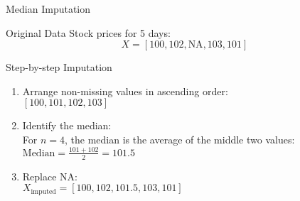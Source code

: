 \documentclass{beamer}
\begin{document}
\begin{frame}{Median Imputation}
   \begin{block}{Original Data}
       Stock prices for 5 days:
       \[
       X = [100, 102, \text{NA}, 103, 101]
       \]
   \end{block}

   \begin{block}{Step-by-step Imputation}
       \begin{enumerate}
           \item Arrange non-missing values in ascending order:\\
           $[100, 101, 102, 103]$
           \item Identify the median:\\
           For $n=4$, the median is the average of the middle two values:\\
           $\text{Median} = \frac{101 + 102}{2} = 101.5$
           \item Replace NA:\\
           $X_{\text{imputed}} = [100, 102, \mathbf{101.5}, 103, 101]$
       \end{enumerate}
   \end{block}
\end{frame}
\end{document}
